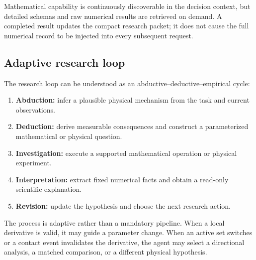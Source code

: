 Mathematical capability is continuously discoverable in the decision context, but detailed schemas and raw numerical results are retrieved on demand. A completed result updates the compact research packet; it does not cause the full numerical record to be injected into every subsequent request.

\subsection{Adaptive research loop}

The research loop can be understood as an abductive--deductive--empirical cycle:
\begin{enumerate}
  \item \textbf{Abduction:} infer a plausible physical mechanism from the task and current observations.
  \item \textbf{Deduction:} derive measurable consequences and construct a parameterized mathematical or physical question.
  \item \textbf{Investigation:} execute a supported mathematical operation or physical experiment.
  \item \textbf{Interpretation:} extract fixed numerical facts and obtain a read-only scientific explanation.
  \item \textbf{Revision:} update the hypothesis and choose the next research action.
\end{enumerate}
The process is adaptive rather than a mandatory pipeline. When a local derivative is valid, it may guide a parameter change. When an active set switches or a contact event invalidates the derivative, the agent may select a directional analysis, a matched comparison, or a different physical hypothesis.
